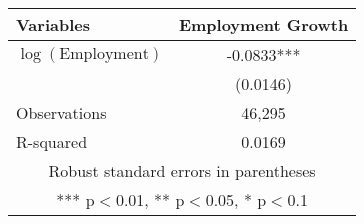 \small{
\begin{tabular}{lc} \hline\hline
Variables & Employment Growth \\ \hline
$\log\left(\text{Employment}\right)$ & -0.0833*** \\
 & (0.0146) \\
\hline
Observations & 46,295 \\
 R-squared & 0.0169 \\ \hline\hline
\multicolumn{2}{c}{ Robust standard errors in parentheses} \\
\multicolumn{2}{c}{ *** p$<$0.01, ** p$<$0.05, * p$<$0.1} \\
\end{tabular}
}
